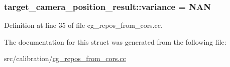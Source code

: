 \subsubsection[{\texorpdfstring{variance}{variance}}]{ target\+\_\+camera\+\_\+position\+\_\+result\+::variance = N\+AN}\hypertarget{structtarget__camera__position__result_af17c7e224cdb90691847e995535c0d50}{}\label{structtarget__camera__position__result_af17c7e224cdb90691847e995535c0d50}


Definition at line 35 of file cg\+\_\+rcpos\+\_\+from\+\_\+cors.\+cc.



The documentation for this struct was generated from the following file\+:\begin{DoxyCompactItemize}
\item 
src/calibration/\hyperlink{cg__rcpos__from__cors_8cc}{cg\+\_\+rcpos\+\_\+from\+\_\+cors.\+cc}\end{DoxyCompactItemize}
